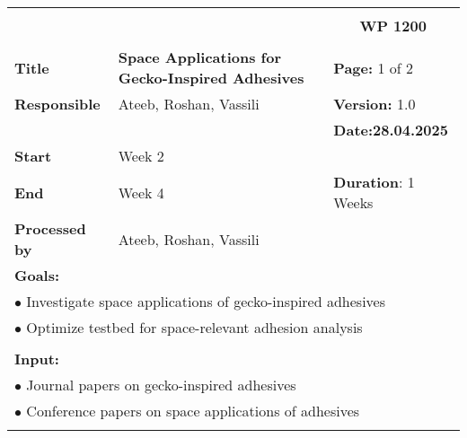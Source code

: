 \begin{table}[!h]
    \begin{center}
        \begin{tabular}{|p{}||p{}|p{}||p{}|}
            \hline
            \multicolumn{3}{|l||}{\textbf{}} & \multicolumn{1}{c|}{}\\
            \multicolumn{3}{|l||}{\textbf{}} & \multicolumn{1}{c|}{\textbf{WP 1200}}\\
            \multicolumn{3}{|l||}{\textbf{}} & \multicolumn{1}{c|}{}\\
            \hline\hline
            \textbf{Title} & \multicolumn{2}{p{.40\columnwidth}||}{\textbf{Space Applications for Gecko-Inspired Adhesives}}
            & \textbf{Page:} 1 of 2\\
            \hline
            \textbf{Responsible} & \multicolumn{2}{l||}{Ateeb, Roshan, Vassili} & \textbf{Version:} 1.0\\
            \hline
            \multicolumn{3}{|l||}{} & \textbf{Date:28.04.2025} \\
            \hline\hline
            \textbf{Start} & \multicolumn{2}{l||}{Week 2} & \\
            \hline
            \textbf{End} & \multicolumn{2}{l||}{Week 4} & \textbf{Duration}: 1 Weeks\\
            \hline\hline
            \textbf{Processed by} & \multicolumn{3}{l|}{Ateeb, Roshan, Vassili}\\
            \hline\hline
            \multicolumn{4}{|p{.95\columnwidth}|}{\textbf{Goals:}}\\
            \multicolumn{4}{|p{.95\columnwidth}|}{$\bullet$ Investigate space applications of gecko-inspired adhesives}\\
            \multicolumn{4}{|p{.95\columnwidth}|}{$\bullet$ Optimize testbed for space-relevant adhesion analysis}\\
            \multicolumn{4}{|p{.95\columnwidth}|}{}\\
            \multicolumn{4}{|p{.95\columnwidth}|}{\textbf{Input:}}\\
            \multicolumn{4}{|p{.95\columnwidth}|}{$\bullet$ Journal papers on gecko-inspired adhesives}\\
            \multicolumn{4}{|p{.95\columnwidth}|}{$\bullet$ Conference papers on space applications of adhesives}\\
            \multicolumn{4}{|p{.95\columnwidth}|}{}\\

\end{tabular}
\end{center}
\end{table}
